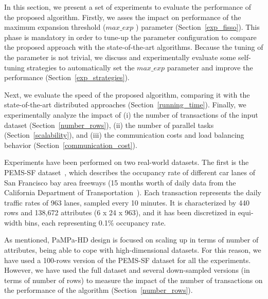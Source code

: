 In this section, we present a set of experiments to evaluate the performance of the proposed algorithm. 
Firstly, we asses the impact on performance of the maximum expansion threshold ($max\_exp$ ) parameter (Section~\ref{exp_fisso}). This phase is mandatory in order to tune-up the parameter configuration to compare the proposed approach with the state-of-the-art algorithms. Because the tuning of the parameter is not trivial, 
we discuss and experimentally evaluate some self-tuning
strategies to automatically set the $max\_exp$ parameter and improve the performance (Section~\ref{exp_strategies}). 

Next, we evaluate the speed of the proposed algorithm,
comparing it with the state-of-the-art distributed approaches 
(Section~\ref{running_time}). 
Finally, we experimentally analyze the impact of 
(i) the number of transactions of the input dataset (Section~\ref{number_rows}),
(ii) the number of parallel tasks (Section~\ref{scalability}), and
(iii) the communication costs and load balancing behavior (Section~\ref{communication_cost}).

Experiments have been performed on two real-world datasets.
The first is the PEMS-SF dataset~\cite{uci},
which describes the occupancy rate of different car lanes 
of San Francisco bay area freeways 
(15 months worth of daily data from the California Department of Transportation~\cite{pems}).
Each transaction represents the daily traffic rates of 963 lanes, sampled every 10 minutes.
It is characterized by 440 rows and 138,672 attributes (6 x 24 x 963), 
and it has been discretized in equi-width bins, each representing 0.1\% occupancy rate.

As mentioned, PaMPa-HD design is focused on scaling up in terms of number of attributes, 
being able to cope with high-dimensional datasets. For this reason, we have used a 100-rows version of the PEMS-SF dataset for all the experiments. However, we have used the full dataset and several down-sampled versions (in terms of number of rows) to measure the impact of the number of transactions on the performance of the algorithm (Section~\ref{number_rows}).

